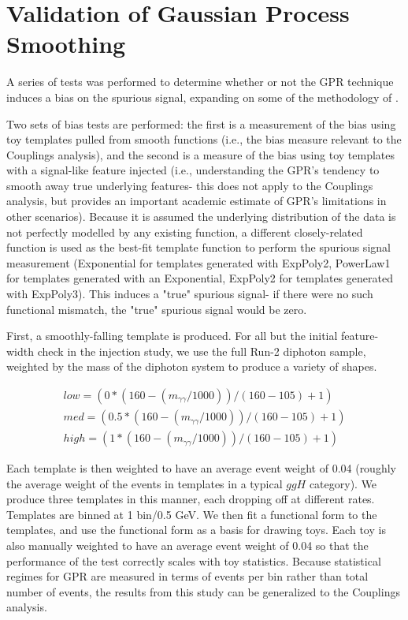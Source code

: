 \section{Validation of Gaussian Process Smoothing}
\label{sec:GPR_validation}
A series of tests was performed to determine whether or not the GPR technique induces a bias on the spurious signal, expanding on some of the methodology of \cite{Hyneman}.

Two sets of bias tests are performed: the first is a measurement of the bias using toy templates pulled from smooth functions (i.e., the bias measure relevant to the Couplings analysis), and the second is a measure of the bias using toy templates with a signal-like feature injected (i.e., understanding the GPR's tendency to smooth away true underlying features- this does not apply to the Couplings analysis, but provides an important academic estimate of GPR's limitations in other scenarios). Because it is assumed the underlying distribution of the data is not perfectly modelled by any existing function, a different closely-related function is used as the best-fit template function to perform the spurious signal measurement (Exponential for templates generated with ExpPoly2, PowerLaw1 for templates generated with an Exponential, ExpPoly2 for templates generated with ExpPoly3). This induces a "true" spurious signal- if there were no such functional mismatch, the "true" spurious signal would be zero.

First, a smoothly-falling template is produced. For all but the initial feature-width check in the injection study, we use the full Run-2 \SHERPA diphoton sample, weighted by the mass of the diphoton system to produce a variety of shapes.

\begin{equation}
\begin{split}
low = (0*(160-(m_{\gamma\gamma}/1000))/(160-105)+1) \\
med = (0.5*(160-(m_{\gamma\gamma}/1000))/(160-105)+1) \\
high= (1*(160-(m_{\gamma\gamma}/1000))/(160-105)+1)
\end{split}
\end{equation}

Each template is then weighted to have an average event weight of 0.04 (roughly the average weight of the events in templates in a typical $ggH$ category). We produce three templates in this manner, each dropping off at different rates. Templates are binned at 1 bin/0.5 GeV. We then fit a functional form to the templates, and use the functional form as a basis for drawing toys.  Each toy is also manually weighted to have an average event weight of 0.04 so that the performance of the test correctly scales with toy statistics. Because statistical regimes for GPR are measured in terms of events per bin rather than total number of events, the results from this study can be generalized to the Couplings analysis. 


